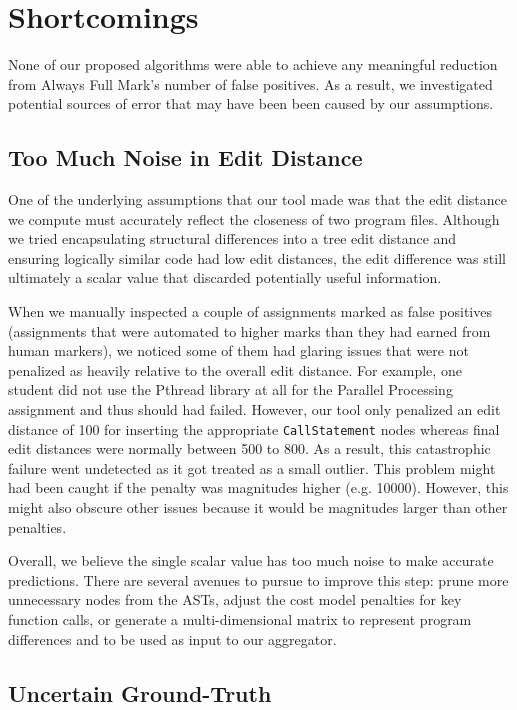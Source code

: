 \section{Shortcomings}

None of our proposed algorithms were able to achieve any meaningful reduction from Always Full Mark's number of false positives. As a result, we investigated potential sources of error that may have been been caused by our assumptions.

\subsection{Too Much Noise in Edit Distance}
\label{sec:ctm-too-much-noise}

One of the underlying assumptions that our tool made was that the edit distance we compute must accurately reflect the closeness of two program files. Although we tried encapsulating structural differences into a tree edit distance and ensuring logically similar code had low edit distances, the edit difference was still ultimately a scalar value that discarded potentially useful information.

When we manually inspected a couple of assignments marked as false positives (assignments that were automated to higher marks than they had earned from human markers), we noticed some of them had glaring issues that were not penalized as heavily relative to the overall edit distance. For example, one student did not use the Pthread library at all for the Parallel Processing assignment and thus should had failed. However, our tool only penalized  an edit distance of 100 for inserting the appropriate \texttt{CallStatement} nodes whereas final edit distances were normally between 500 to 800. As a result, this catastrophic failure went undetected as it got treated as a small outlier. This problem might had been caught if the penalty was magnitudes higher (e.g. \num{10000}). However, this might also obscure other issues because it would be magnitudes larger than other penalties.

Overall, we believe the single scalar value has too much noise to make accurate predictions. There are several avenues to pursue to improve this step: prune more unnecessary nodes from the ASTs, adjust the cost model penalties for key function calls, or generate a multi-dimensional matrix to represent program differences and to be used as input to our aggregator.

\subsection{Uncertain Ground-Truth}
\label{sec:ctm-uncertain-ground-truth}

